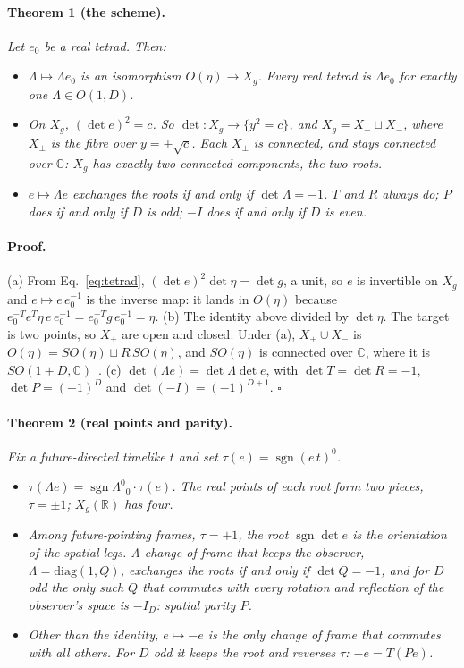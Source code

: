 \documentclass[twocolumn]{iopjournal}
\newcommand{\sgn}{\operatorname{sgn}}
\begin{document}
\paragraph{Theorem 1 (the scheme).} \textit{Let $e_0$ be a real
tetrad. Then:}
\begin{itemize}
\item[(a)] \textit{$\Lambda \mapsto \Lambda e_0$ is an isomorphism
  $O(\eta) \to X_g$. Every real tetrad is $\Lambda e_0$ for exactly
  one $\Lambda \in O(1,D)$.}
\item[(b)] \textit{On $X_g$, $(\det e)^2 = c$. So
  $\det : X_g \to \{y^2 = c\}$, and $X_g = X_+ \sqcup X_-$, where
  $X_\pm$ is the fibre over $y = \pm\sqrt c$. Each $X_\pm$ is
  connected, and stays connected over $\mathbb{C}$: $X_g$ has exactly
  two connected components, the two roots.}
\item[(c)] \textit{$e \mapsto \Lambda e$ exchanges the roots if and
  only if $\det \Lambda = -1$. $T$ and $R$ always do; $P$ does if and
  only if $D$ is odd; $-I$ does if and only if $D$ is even.}
\end{itemize}

\paragraph{Proof.} (a) From Eq.~\eqref{eq:tetrad},
$(\det e)^2 \det \eta = \det g$, a unit, so $e$ is invertible on
$X_g$ and $e \mapsto e\,e_0^{-1}$ is the inverse map: it lands in
$O(\eta)$ because $e_0^{-T} e^T \eta\, e\, e_0^{-1} = e_0^{-T} g\,
e_0^{-1} = \eta$. (b) The identity above divided by $\det \eta$. The
target is two points, so $X_\pm$ are open and closed. Under (a),
$X_+ \cup X_-$ is $O(\eta) = SO(\eta) \sqcup R\,SO(\eta)$, and
$SO(\eta)$ is connected over $\mathbb{C}$, where it is
$SO(1 + D, \mathbb{C})$~\cite{Borel1991}. (c)
$\det(\Lambda e) = \det \Lambda \det e$, with $\det T = \det R = -1$,
$\det P = (-1)^D$ and $\det(-I) = (-1)^{D+1}$. \hfill $\square$

\paragraph{Theorem 2 (real points and parity).} \textit{Fix a
future-directed timelike $t$ and set $\tau(e) = \sgn (e\,t)^0$.}
\begin{itemize}
\item[(a)] \textit{$\tau(\Lambda e) = \sgn \Lambda^0{}_0 \cdot
  \tau(e)$. The real points of each root form two pieces,
  $\tau = \pm 1$; $X_g(\mathbb{R})$ has four.}
\item[(b)] \textit{Among future-pointing frames, $\tau = +1$, the
  root $\sgn \det e$ is the orientation of the spatial legs. A change
  of frame that keeps the observer, $\Lambda = \mathrm{diag}(1, Q)$,
  exchanges the roots if and only if $\det Q = -1$, and for $D$ odd
  the only such $Q$ that commutes with every rotation and reflection
  of the observer's space is $-I_D$: spatial parity $P$.}
\item[(c)] \textit{Other than the identity, $e \mapsto -e$ is the
  only change of frame that commutes with all others. For $D$ odd it keeps the root and reverses
  $\tau$: $-e = T(Pe)$.}
\end{itemize}
\end{document}
